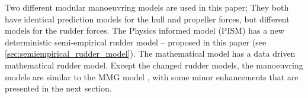 Two different modular manoeuvring models are used in this paper; They both have identical prediction models for the hull and propeller forces, but different models for the rudder forces. The Physics informed model (PISM) has a new deterministic semi-empirical rudder model -- proposed in this paper (see \autoref{sec:semiempirical_rudder_model}). The mathematical model has a data driven mathematical rudder model. 
Except the changed rudder models, the manoeuvring models are similar to the MMG model \citep{yasukawa_introduction_2015}, with some minor enhancements that are presented in the next section.
